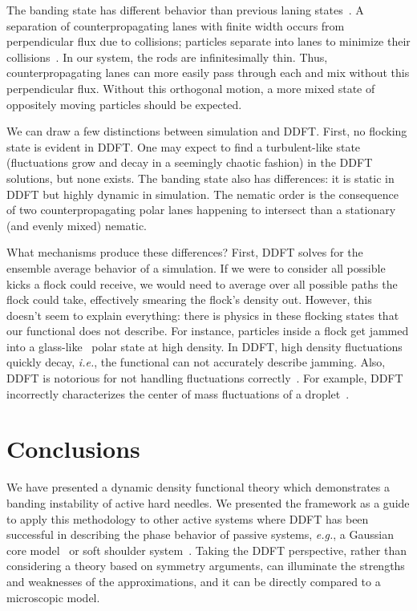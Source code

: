 The banding state has different behavior than previous laning
states~\cite{wensink_emergent_12, kuan_hysteresis_15, mccandlish_spontaneous_12,
  chakrabarti_dynamical_03}. A separation of counterpropagating lanes with 
finite width occurs from perpendicular flux due to collisions; particles
separate into lanes to minimize their collisions~\cite{chakrabarti_dynamical_03,
  kuan_hysteresis_15, mccandlish_spontaneous_12}. In our system, the rods are
infinitesimally thin. Thus, counterpropagating lanes can more easily pass
through each and mix without this perpendicular flux. Without this orthogonal
motion, a more mixed state of oppositely moving particles should be expected.

We can draw a few distinctions between simulation and DDFT\@. First, no flocking
state is evident in DDFT\@. One may expect to find a turbulent-like state
(fluctuations grow and decay in a seemingly chaotic fashion) in the DDFT
solutions, but none exists. The banding state also has differences: it is static
in DDFT but highly dynamic in simulation. The nematic order is the consequence
of two counterpropagating polar lanes happening to intersect than a stationary
(and evenly mixed) nematic.

What mechanisms produce these differences? First, 
DDFT solves for the ensemble average behavior of a
simulation.  If we were to consider all possible kicks a flock could receive, we
would need to average over all possible paths the flock could take, effectively
smearing the flock's density out. However, this doesn't seem to explain
everything: there is physics in these flocking states that our functional does
not describe.  For instance, particles inside a flock get jammed into a 
glass-like~\cite{kuan_hysteresis_15} polar state at high density. In DDFT, high
density fluctuations quickly decay, \textit{i.e.}, the functional can not
accurately describe jamming. Also, DDFT is notorious for not handling
fluctuations correctly~\cite{evans_nature_79, archer_interplay_11,
  malijevsky_sedimentation_13}.  For example, DDFT incorrectly characterizes the
center of mass fluctuations of a droplet~\cite{reguera_role_04}.

\section{Conclusions}
We have presented a dynamic density functional theory which demonstrates a
banding instability of active hard needles. We presented the framework as a
guide to apply this methodology to other active systems where DDFT has been
successful in describing the phase behavior of passive systems, \textit{e.g.},
a Gaussian core model~\cite{lang_fluid_00, dzubiella_meanfield_03} or soft
shoulder system~\cite{archer_quasicrystalline_13}.  Taking the
DDFT perspective, rather than considering a theory based on symmetry
arguments, can illuminate the strengths and weaknesses of the
approximations, and it can be directly compared to a microscopic model.

